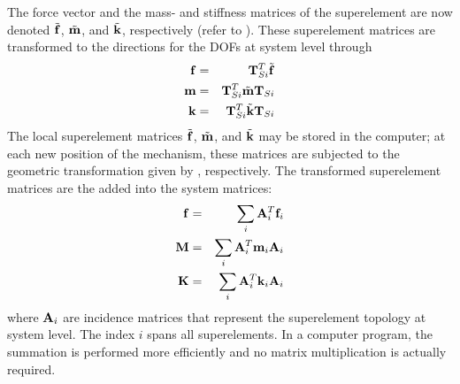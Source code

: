 {The force vector and the mass- and stiffness matrices of the superelement are
now denoted $\tilde{\bf f}$, $\tilde{\bf m}$, and $\tilde{\bf k}$, respectively
(refer to ).
These superelement matrices are transformed to the directions for the DOFs at
system level through
%
\begin{eqnarray}
{\bf f} &=& {\bf T}_{Si}^T \tilde{\bf f} \\
{\bf m} &=& {\bf T}_{Si}^T \tilde{\bf m} {\bf T}_{Si} \label{eqSC:510} \\
{\bf k} &=& {\bf T}_{Si}^T \tilde{\bf k} {\bf T}_{Si} \label{eqSC:511}
\end{eqnarray}
%
The local superelement matrices $\tilde{\bf f}$, $\tilde{\bf m}$,
and $\tilde{\bf k}$ may be stored in the computer; at each new position of the
mechanism, these matrices are subjected to the geometric transformation given by
, respectively.
The transformed superelement matrices are the added into the system matrices:
%
\begin{eqnarray}
{\bf f} &=& \sum_i {\bf A}_i^T {\bf f}_i \\
{\bf M} &=& \sum_i {\bf A}_i^T {\bf m}_i {\bf A}_i \label{eqSC:512} \\
{\bf K} &=& \sum_i {\bf A}_i^T {\bf k}_i {\bf A}_i \label{eqSC:513}
\end{eqnarray}
%
where ${\bf A}_i$ are incidence matrices that represent the superelement
topology at system level.
The index $i$ spans all superelements.
In a computer program, the summation is performed more efficiently
and no matrix multiplication is actually required.

} %
